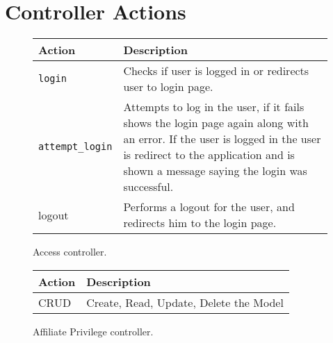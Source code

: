 \chapter{Controller Actions}
\label{app:controller_actions}

\begin{figure}[htb]
\begin{center}
\begin{tabular}{ | l | p{8cm} | }
  \hline
    \textbf{Action} & \textbf{Description} \\ \hline
    \verb+login+ & Checks if user is logged in or redirects user to login page. \\ \hline
    \verb+attempt_login+ & Attempts to log in the user, if it fails shows the login page again along with an error. If the user is logged in the user is redirect to the application and is shown a message saying the login was successful. \\ \hline
    logout & Performs a logout for the user, and redirects him to the login page. \\ \hline
\end{tabular}
\caption{Access controller.}
\label{tab:access_controller_actions}
\end{center}
\end{figure}

\begin{figure}[htb]
\begin{center}
\begin{tabular}{ | l | p{8cm} | }
  \hline
    \textbf{Action} & \textbf{Description} \\ \hline
    CRUD & Create, Read, Update, Delete the Model \\ \hline
\end{tabular}
\caption{Affiliate Privilege controller.}
\label{tab:affpriv_controller_actions}
\end{center}
\end{figure}

